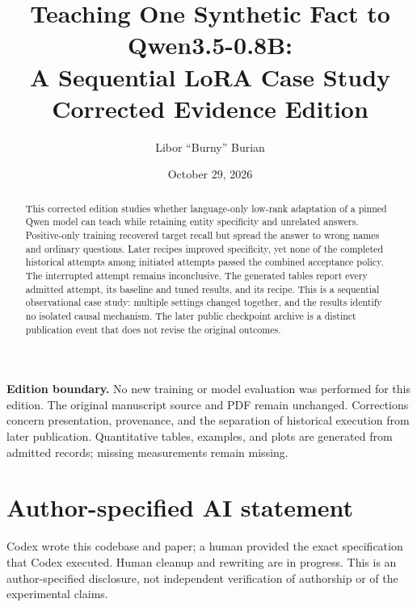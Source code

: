 \documentclass[11pt,letterpaper]{article}
\title{Teaching One Synthetic Fact to Qwen3.5-0.8B:\\A Sequential LoRA Case Study\\Corrected Evidence Edition}
\author{Libor ``Burny'' Burian}
\date{October 29, 2026}
\begin{document}
\maketitle
\begin{abstract}
This corrected edition studies whether language-only low-rank adaptation of a
pinned Qwen model can teach \Fact{} while retaining entity specificity and
unrelated answers. Positive-only training recovered target recall but spread
the answer to wrong names and ordinary questions. Later recipes improved
specificity, yet none of the \StudyCompleted{} completed historical attempts
among \StudyAttempts{} initiated attempts passed the combined
acceptance policy. The interrupted attempt remains inconclusive. The generated
tables report every admitted attempt, its baseline and tuned results, and its
recipe. This is a sequential observational case study: multiple settings
changed together, and the results identify no isolated causal mechanism.
The later public checkpoint archive is a distinct publication event that does
not revise the original outcomes.\citep{historicalmanifest,retrospective,archive}
\end{abstract}

\begin{center}\end{center}

\textbf{Edition boundary.} No new training or model evaluation was performed
for this edition. The original manuscript source and PDF remain unchanged.
Corrections concern presentation, provenance, and the separation of historical
execution from later publication. Quantitative tables, examples, and plots are
generated from admitted records; missing measurements remain missing.







\section*{Author-specified AI statement}
Codex wrote this codebase and paper; a human provided the exact specification
that Codex executed. Human cleanup and rewriting are in progress. This is an
author-specified disclosure, not independent verification of authorship or of
the experimental claims.
\end{document}
